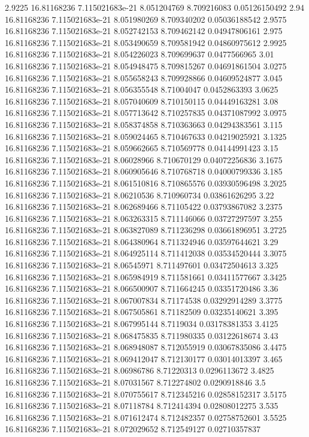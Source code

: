 {2.9225 16.81168236 7.115021683e-21 8.051204769 8.709216083 0.05126150492
2.94 16.81168236 7.115021683e-21 8.051980269 8.709340202 0.05036188542
2.9575 16.81168236 7.115021683e-21 8.052742153 8.709462142 0.04947806161
2.975 16.81168236 7.115021683e-21 8.053490659 8.709581942 0.04860975612
2.9925 16.81168236 7.115021683e-21 8.054226023 8.709699637 0.0477566965
3.01 16.81168236 7.115021683e-21 8.054948475 8.709815267 0.04691861504
3.0275 16.81168236 7.115021683e-21 8.055658243 8.709928866 0.04609524877
3.045 16.81168236 7.115021683e-21 8.056355548 8.71004047 0.0452863393
3.0625 16.81168236 7.115021683e-21 8.057040609 8.710150115 0.04449163281
3.08 16.81168236 7.115021683e-21 8.057713642 8.710257835 0.04371087992
3.0975 16.81168236 7.115021683e-21 8.058374858 8.710363663 0.04294383561
3.115 16.81168236 7.115021683e-21 8.059024465 8.710467633 0.04219025921
3.1325 16.81168236 7.115021683e-21 8.059662665 8.710569778 0.04144991423
3.15 16.81168236 7.115021683e-21 8.06028966 8.710670129 0.04072256836
3.1675 16.81168236 7.115021683e-21 8.060905646 8.710768718 0.04000799336
3.185 16.81168236 7.115021683e-21 8.061510816 8.710865576 0.03930596498
3.2025 16.81168236 7.115021683e-21 8.06210536 8.710960734 0.03861626295
3.22 16.81168236 7.115021683e-21 8.062689466 8.71105422 0.03793867082
3.2375 16.81168236 7.115021683e-21 8.063263315 8.711146066 0.03727297597
3.255 16.81168236 7.115021683e-21 8.063827089 8.711236298 0.03661896951
3.2725 16.81168236 7.115021683e-21 8.064380964 8.711324946 0.03597644621
3.29 16.81168236 7.115021683e-21 8.064925114 8.711412038 0.03534520444
3.3075 16.81168236 7.115021683e-21 8.06545971 8.711497601 0.03472504613
3.325 16.81168236 7.115021683e-21 8.065984919 8.711581661 0.03411577667
3.3425 16.81168236 7.115021683e-21 8.066500907 8.711664245 0.03351720486
3.36 16.81168236 7.115021683e-21 8.067007834 8.71174538 0.03292914289
3.3775 16.81168236 7.115021683e-21 8.067505861 8.71182509 0.03235140621
3.395 16.81168236 7.115021683e-21 8.067995144 8.7119034 0.03178381353
3.4125 16.81168236 7.115021683e-21 8.068475835 8.711980335 0.03122618674
3.43 16.81168236 7.115021683e-21 8.068948087 8.712055919 0.03067835086
3.4475 16.81168236 7.115021683e-21 8.069412047 8.712130177 0.03014013397
3.465 16.81168236 7.115021683e-21 8.06986786 8.71220313 0.0296113672
3.4825 16.81168236 7.115021683e-21 8.07031567 8.712274802 0.0290918846
3.5 16.81168236 7.115021683e-21 8.070755617 8.712345216 0.02858152317
3.5175 16.81168236 7.115021683e-21 8.07118784 8.712414394 0.02808012275
3.535 16.81168236 7.115021683e-21 8.071612474 8.712482357 0.02758752601
3.5525 16.81168236 7.115021683e-21 8.072029652 8.712549127 0.02710357837
}
